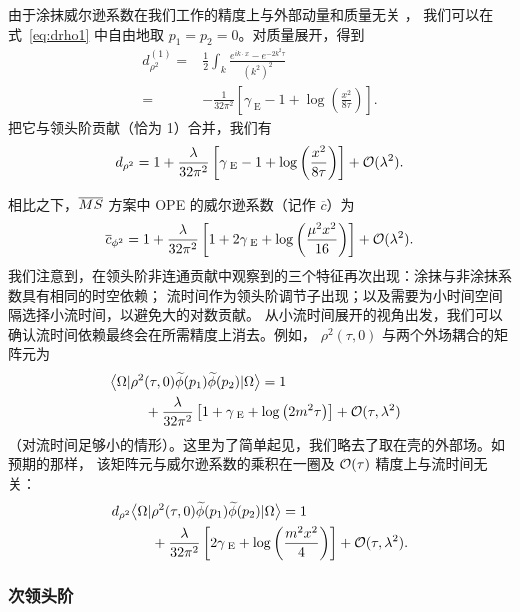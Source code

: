 由于涂抹威尔逊系数在我们工作的精度上与外部动量和质量无关 \cite{Collins:1984rdg}，
我们可以在式~\eqref{eq:drho1} 中自由地取 $p_1 = p_2 = 0$。对质量展开，得到
\begin{align}
d_{\rho^2}^{(1)} = {} &
\frac{1}{2}\int_k
\frac{e^{ik\cdot x} - e^{-2k^2 \tau }}{(k^2)^2} \nonumber \\
= {} & -\frac{1}{32\pi^2}\left[\gamma_{\;\mathrm{E}} -1 +
\log\left(\frac{x^2}{8\tau}\right)\right].
\end{align}
把它与领头阶贡献（恰为 1）合并，我们有
\begin{equation}\label{eq:drhores}
d_{\rho^2}= 1 +\frac{\lambda}{32\pi^2}\left[\gamma_{\;\mathrm{E}} -1 +
\log\left(\frac{x^2}{8\tau}\right)\right]+{\cal O}(\lambda^2).
\end{equation}

相比之下，$\overline{MS}$ 方案中 OPE 的威尔逊系数（记作
$\overline{c}$）为
\begin{equation}\label{eq:cphires}
\overline{c}_{\phi^2} =  1+\frac{\lambda}{32\pi^2} \left[1
+2\gamma_{\;\mathrm{E}}+
\log\left(\frac{\mu^2x^2}{16}\right)\right]+{\cal O}(\lambda^2).
\end{equation}
我们注意到，在领头阶非连通贡献中观察到的三个特征再次出现：涂抹与非涂抹系数具有相同的时空依赖；
流时间作为领头阶调节子出现；以及需要为小时间空间隔选择小流时间，以避免大的对数贡献。
从小流时间展开的视角出发，我们可以确认流时间依赖最终会在所需精度上消去。例如，
$\rho^2(\tau,0)$ 与两个外场耦合的矩阵元为
\begin{align}
\!\!\!\!\big\langle \Omega
|{} & \rho^2(\tau,0)\widetilde{\phi}(p_1) \widetilde{\phi}(p_2)
|\Omega \big\rangle = 1  \nonumber\\
{} &\quad +\frac{\lambda}{32\pi^2}\left[1+\gamma_{\;\mathrm{E}} +
\log\left(2m^2\tau\right)\right]
+{\cal O}(\tau,\lambda^2)
\end{align}
（对流时间足够小的情形）。这里为了简单起见，我们略去了取在壳的外部场。如预期的那样，
该矩阵元与威尔逊系数的乘积在一圈及 ${\cal O}(\tau)$ 精度上与流时间无关：
\begin{align}
d_{\rho^2}\big\langle  \Omega
|{} &\rho^2(\tau,0)\widetilde{\phi}(p_1)\widetilde{\phi}(p_2)
| \Omega \big\rangle =  1 \nonumber\\
{} &
+\frac{\lambda}{32\pi^2}\left[2\gamma_{\;\mathrm{E}} +
\log\left(\frac{m^2x^2}{4}\right)\right]+{\cal O}(\tau,\lambda^2).
\end{align}


\subsubsection{次领头阶}


